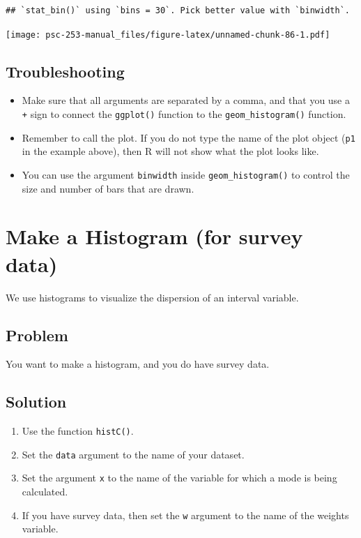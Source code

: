 \documentclass[
]{book}
\providecommand{\tightlist}{%
  \setlength{\itemsep}{0pt}\setlength{\parskip}{0pt}}
\begin{document}
\begin{verbatim}
## `stat_bin()` using `bins = 30`. Pick better value with `binwidth`.
\end{verbatim}

\texttt{[image: psc-253-manual\_files/figure-latex/unnamed-chunk-86-1.pdf]}

\hypertarget{troubleshooting-33}{%
\subsection{Troubleshooting}\label{troubleshooting-33}}

\begin{itemize}
\item
  Make sure that all arguments are separated by a comma, and that you use a \texttt{+} sign to connect the \texttt{ggplot()} function to the \texttt{geom\_histogram()} function.
\item
  Remember to call the plot. If you do not type the name of the plot object (\texttt{p1} in the example above), then R will not show what the plot looks like.
\item
  You can use the argument \texttt{binwidth} inside \texttt{geom\_histogram()} to control the size and number of bars that are drawn.
\end{itemize}

\hypertarget{histSurvey}{%
\section{Make a Histogram (for survey data)}\label{histSurvey}}

We use histograms to visualize the dispersion of an interval variable.

\hypertarget{problem-38}{%
\subsection{Problem}\label{problem-38}}

You want to make a histogram, and you do have survey data.

\hypertarget{solution-37}{%
\subsection{Solution}\label{solution-37}}

\begin{enumerate}
\def\labelenumi{\arabic{enumi}.}
\tightlist
\item
  Use the function \texttt{histC()}.
\item
  Set the \texttt{data} argument to the name of your dataset.
\item
  Set the argument \texttt{x} to the name of the variable for which a mode is being calculated.
\item
  If you have survey data, then set the \texttt{w} argument to the name of the weights variable.
\end{enumerate}
\end{document}
